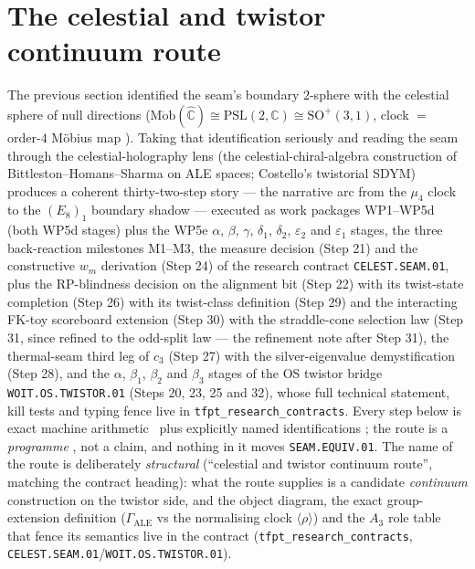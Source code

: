 \documentclass[11pt,a4paper]{article}
\theoremstyle{definition}
\begin{document}
\section{The celestial and twistor continuum route}\label{sec:celestial}
The previous section identified the seam's boundary $2$-sphere with the celestial sphere of null
directions ($\mathrm{M\ddot{o}b}(\hat{\mathbb C})\cong\mathrm{PSL}(2,\mathbb C)\cong\mathrm{SO}^+(3,1)$,
clock $=$ order-$4$ M\"obius map ). Taking that identification seriously
and reading the seam through the celestial-holography lens (the celestial-chiral-algebra construction of
Bittleston--Homans--Sharma on ALE spaces; Costello's twistorial SDYM) produces a coherent
thirty-two-step
story --- the narrative arc from the $\mu_4$ clock to the $(E_8)_1$ boundary shadow --- executed as
work packages WP1--WP5d (both WP5d stages) plus the WP5e $\alpha$, $\beta$,
$\gamma$, $\delta_1$, $\delta_2$, $\varepsilon_2$ and $\varepsilon_1$ stages, the three back-reaction
milestones M1--M3, the measure decision (Step 21) and the constructive $w_m$ derivation
(Step 24) of the research contract
\texttt{CELEST.SEAM.01}, plus the RP-blindness decision on the alignment bit (Step 22) with its
twist-state completion (Step 26) with its twist-class definition (Step 29)
and the interacting FK-toy scoreboard extension (Step 30) with the straddle-cone
selection law (Step 31, since refined to the odd-split law --- the refinement note after
Step 31), the thermal-seam
third leg of $c_3$ (Step 27) with the silver-eigenvalue demystification (Step 28), and the
$\alpha$, $\beta_1$, $\beta_2$ and $\beta_3$ stages of the OS twistor bridge
\texttt{WOIT.OS.TWISTOR.01} (Steps 20, 23, 25 and 32), whose
full technical statement, kill tests and typing fence live in \texttt{tfpt\_research\_contracts}. Every
step below is exact machine arithmetic \mE\ plus explicitly named identifications \mC; the route is a
\emph{programme} \mO, not a claim, and nothing in it moves \texttt{SEAM.EQUIV.01}. The name of the
route is deliberately \emph{structural} (``celestial and twistor continuum route'', matching the
contract heading): what the route supplies is a candidate \emph{continuum} construction on the twistor
side, and the object diagram, the exact group-extension definition ($\Gamma_{\mathrm{ALE}}$ vs the
normalising clock $\langle\rho\rangle$) and the $A_3$ role table that fence its semantics live in the
contract (\texttt{tfpt\_research\_contracts}, \texttt{CELEST.SEAM.01}/\texttt{WOIT.OS.TWISTOR.01}).
\end{document}
